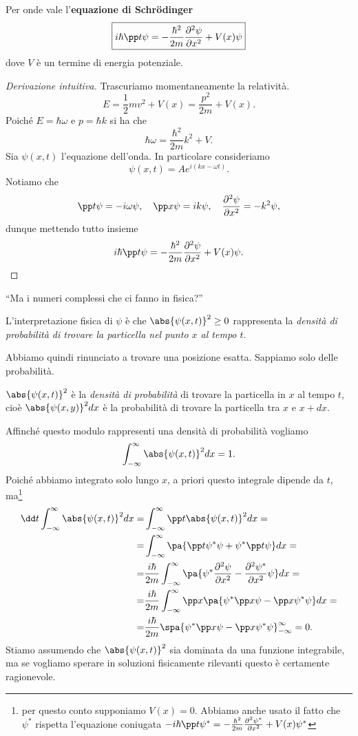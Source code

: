 \begin{theorem}\label{EquazioneSchrodinger}
Per onde vale l'\textbf{equazione di Schr\"odinger}
\[\boxed{i\hbar \pp t\psi=-\frac{\hbar^2}{2m}\pps[2]x\psi +V(x)\psi}\]
dove $V$ \`e un termine di energia potenziale.
\end{theorem}
\begin{proof}[Derivazione intuitiva]
Trascuriamo momentaneamente la relativit\`a.
\[E=\frac12mv^2+V(x)=\frac{p^2}{2m}+V(x).\]
Poich\'e $E=\hbar \omega$ e $p=\hbar k$ si ha che
\[\hbar \omega=\frac{\hbar^2}{2m}k^2+V.\]
Sia $\psi(x,t)$ l'equazione dell'onda. In particolare consideriamo
\[\psi(x,t)=Ae^{i(kx-\omega t)}.\]
Notiamo che
\[\pp t\psi=-i\omega\psi,\quad \pp x\psi=ik\psi,\quad \pps[2]x\psi=-k^2\psi,\]
dunque mettendo tutto insieme
\[i\hbar \pp t\psi=-\frac{\hbar^2}{2m}\pps[2]x\psi +V(x)\psi.\]
\end{proof}
\begin{center}
``Ma i numeri complessi che ci fanno in fisica?''
\end{center}
L'interpretazione fisica di $\psi$ \`e che $\abs{\psi(x,t)}^2\geq 0$ rappresenta la \textit{densit\`a di probabilit\`a di trovare la particella nel punto $x$ al tempo $t$}.
\bigskip

\noindent
Abbiamo quindi rinunciato a trovare una posizione esatta. Sappiamo solo delle probabilit\`a.


\begin{remark}
$\abs{\psi(x,t)}^2$ \`e la \textit{densit\`a di probabilit\`a} di trovare la particella in $x$ al tempo $t$, cio\`e $\abs{\psi(x,y)}^2dx$ \`e la probabilit\`a di trovare la particella tra $x$ e $x+dx$.
\end{remark}

\noindent Affinch\'e questo modulo rappresenti una densit\`a di probabilit\`a vogliamo
\[\int_{-\infty}^\infty\abs{\psi(x,t)}^2dx=1.\]
Poich\'e abbiamo integrato solo lungo $x$, a priori questo integrale dipende da $t$, ma\footnote{per questo conto supponiamo $V(x)=0$. Abbiamo anche usato il fatto che $\psi^\ast$ rispetta l'equazione coniugata $-i\hbar \pp t{\psi^\ast}=-\frac{\hbar^2}{2m}\pps[2]x{\psi^\ast} +V(x){\psi^\ast}$}
\begin{align*}
\dd t{}\int_{-\infty}^\infty \abs{\psi(x,t)}^2dx=&\int_{-\infty}^\infty \pp t{}\abs{\psi(x,t)}^2dx=\\
=&\int_{-\infty}^\infty\pa{\pp t{\psi^\ast}\psi+\psi^\ast\pp t{\psi}}dx=\\
=&\frac{i\hbar}{2m}\int_{-\infty}^\infty \pa{\psi^\ast\pps[2]x\psi-\pps[2]x{\psi^\ast}\psi}dx=\\
=&\frac{i\hbar}{2m}\int_{-\infty}^\infty \pp x{}\pa{\psi^\ast\pp x\psi-\pp x{\psi^\ast}\psi}dx=\\
=&\frac{i\hbar}{2m}\spa{\psi^\ast\pp x\psi-\pp x{\psi^\ast}\psi}^\infty_{-\infty}=0.
\end{align*}
Stiamo assumendo che $\abs{\psi(x,t)}^2$ sia dominata da una funzione integrabile, ma se vogliamo sperare in soluzioni fisicamente rilevanti questo \`e certamente ragionevole.

